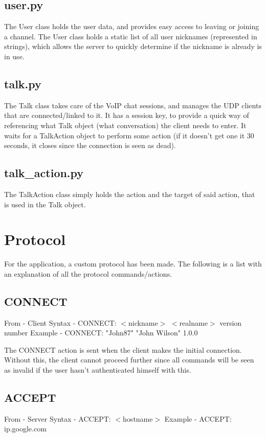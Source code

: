 \documentclass[12pt]{rapport}
\begin{document}
\subsection*{user.py}
The User class holds the user data, and provides easy access to leaving or joining a channel. The User class holds a static list of all user nicknames (represented in strings), which allows the server to quickly determine if the nickname is already is in use.

\subsection*{talk.py}
The Talk class takes care of the VoIP chat sessions, and manages the UDP clients that are connected/linked to it. It has a session key, to provide a quick way of referencing what Talk object (what conversation) the client needs to enter. It waits for a TalkAction object to perform some action (if it doesn't get one it 30 seconds, it closes since the connection is seen as dead). 

\subsection*{talk\_action.py}
The TalkAction class simply holds the action and the target of said action, that is used in the Talk object.


\section*{Protocol}
For the application, a custom protocol has been made. The following is a list with an explanation of all the protocol commands/actions.

\subsection*{CONNECT}
From    - Client\newline
Syntax  - CONNECT: $<$nickname$>$ $<$realname$>$ version number\newline
Example - CONNECT: "John87" "John Wilson" 1.0.0\newline

\noindent The CONNECT action is sent when the client makes the initial connection. Without this, the client cannot proceed further since all commands will be seen as invalid if the user hasn't authenticated himself with this.

\subsection*{ACCEPT}
From    - Server\newline
Syntax  - ACCEPT: $<$hostname$>$\newline
Example - ACCEPT: ip.google.com\newline
\end{document}
